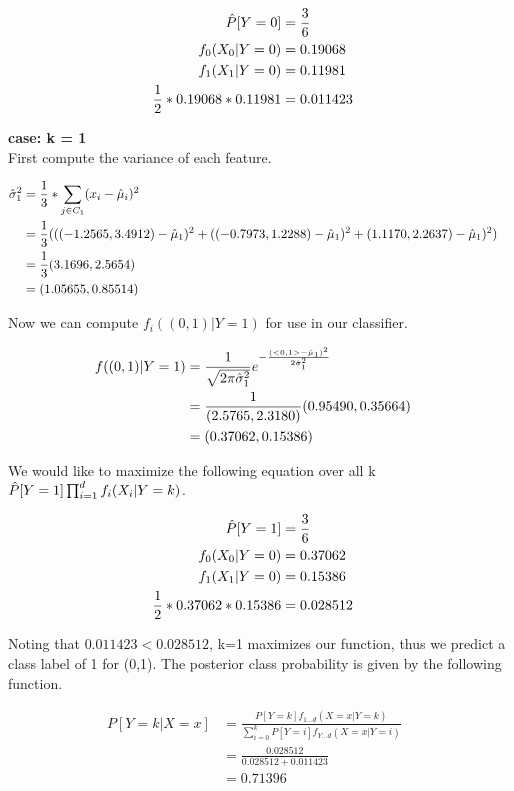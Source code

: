\documentclass{jhwhw}
\begin{document}
    \begin{align*}
	\Hat{P}[Y=0] &= \frac{3}{6} &\\
	f_0(X_0|Y=0) &= 0.19068 &\\
	f_1(X_1|Y=0) &= 0.11981 &\\
	\frac{1}{2}*0.19068*0.11981 &= 0.011423
    \end{align*}

    \bigbreak
    \textbf{case: k = 1} \\

    First compute the variance of each feature.

    \begin{align*}
	\Hat{\sigma}_1^2 &= \frac{1}{3} * \sum_{j\in C_1} (x_i - \Hat{\mu}_i)^2 &\\
	&= \frac{1}{3}(((-1.2565, 3.4912) - \Hat{\mu}_1) ^2 
	    + ((-0.7973, 1.2288) - \Hat{\mu}_1)^2 + (1.1170, 2.2637) - \Hat{\mu}_1)^2) &\\
	&= \frac{1}{3}(3.1696, 2.5654) &\\
	&= (1.05655, 0.85514) &\\
    \end{align*}

    Now we can compute $f_i((0,1)|Y=1)$ for use in our classifier.

    \begin{align*}
	f((0,1)|Y=1) &= \frac{1}{\sqrt{2\pi\Hat{\sigma}_1^2}}
	    e^{-\frac{(<0,1>-\Hat{\mu}_1)^2}{2\Hat{\sigma}_1^2}} &\\
	&= \frac{1}{(2.5765, 2.3180)} (0.95490, 0.35664) &\\
	&= (0.37062, 0.15386)
    \end{align*}

    We would like to maximize the following equation over all k
    $\Hat{P}[Y=1]\prod_{i=1}^{d}f_i(X_i|Y=k)$.

    \begin{align*}
	\Hat{P}[Y=1] &= \frac{3}{6} &\\
	f_0(X_0|Y=0) &= 0.37062 &\\
	f_1(X_1|Y=0) &= 0.15386 &\\
	\frac{1}{2}*0.37062*0.15386 &= 0.028512
    \end{align*}

    Noting that $0.011423 < 0.028512$, k=1 maximizes our function, thus we 
    predict a class label of 1 for (0,1).
    The posterior class probability is given by the following function.

    \begin{align*}
	P[Y=k|X=x] &= \frac{P[Y=k]f_{1\ldots d}(X=x|Y=k)}
	    {\sum_{i=0}^{k} P[Y=i]f_{Y\ldots d}(X=x|Y=i)} &\\
	&= \frac {0.028512} {0.028512 + 0.011423} &\\
	&= 0.71396
    \end{align*}
\end{document}

